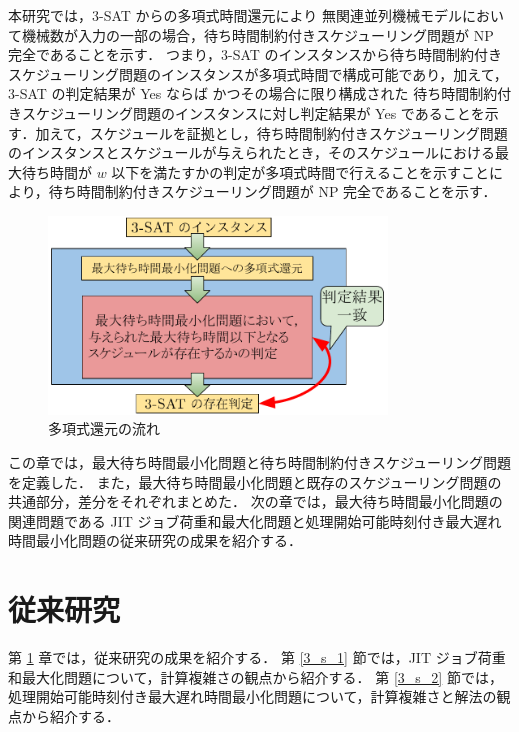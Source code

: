 \documentclass[12pt]{optlab-bachelor}
\begin{document}
本研究では，\textsc{3-SAT} からの多項式時間還元により 無関連並列機械モデルにおいて機械数が入力の一部の場合，待ち時間制約付きスケジューリング問題が NP 完全であることを示す．
つまり，\textsc{3-SAT} のインスタンスから待ち時間制約付きスケジューリング問題のインスタンスが多項式時間で構成可能であり，加えて， \textsc{3-SAT}  の判定結果が Yes ならば
かつその場合に限り構成された 待ち時間制約付きスケジューリング問題のインスタンスに対し判定結果が Yes であることを示す．加えて，スケジュールを証拠とし，待ち時間制約付きスケジューリング問題のインスタンスとスケジュールが与えられたとき，そのスケジュールにおける最大待ち時間が $w$ 以下を満たすかの判定が多項式時間で行えることを示すことにより，待ち時間制約付きスケジューリング問題が NP 完全であることを示す．

\begin{figure}[h]
  \centering
  \includegraphics[width = 9cm]{figure/reduction.pdf}
  \caption{多項式還元の流れ}
\end{figure}

この章では，最大待ち時間最小化問題と待ち時間制約付きスケジューリング問題を定義した．
また，最大待ち時間最小化問題と既存のスケジューリング問題の共通部分，差分をそれぞれまとめた．
次の章では，最大待ち時間最小化問題の関連問題である JIT ジョブ荷重和最大化問題と処理開始可能時刻付き最大遅れ時間最小化問題の従来研究の成果を紹介する．

\chapter{従来研究}\label{c_3}
第 \ref{c_3} 章では，従来研究の成果を紹介する．
第 \ref{3_s_1} 節では，JIT ジョブ荷重和最大化問題について，計算複雑さの観点から紹介する．
第 \ref{3_s_2} 節では，処理開始可能時刻付き最大遅れ時間最小化問題について，計算複雑さと解法の観点から紹介する．
\end{document}
